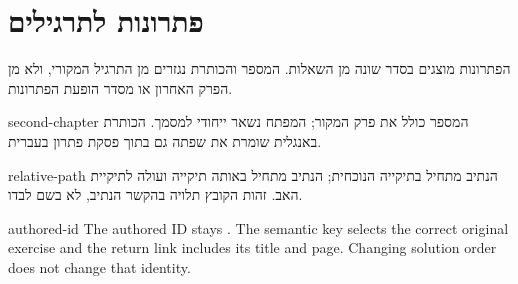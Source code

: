 \chapter*{פתרונות לתרגילים}
הפתרונות מוצגים בסדר שונה מן השאלות. המספר והכותרת נגזרים מן התרגיל
המקורי, ולא מן הפרק האחרון או מסדר הופעת הפתרונות.
\begin{studysolution}{second-chapter}
המספר כולל את פרק המקור; המפתח נשאר ייחודי למסמך. הכותרת באנגלית
שומרת את שפתה גם בתוך פסקת פתרון בעברית.
\end{studysolution}
\begin{studysolution}{relative-path}
הנתיב  מתחיל בתיקייה הנוכחית; הנתיב
 מתחיל באותה תיקייה ועולה לתיקיית האב. זהות הקובץ
תלויה בהקשר הנתיב, לא בשם לבדו.
\end{studysolution}
\begin{englishprose}
\begin{studysolution}{authored-id}
The authored ID stays . The semantic key selects the correct original
exercise and the return link includes its title and page. Changing solution
order does not change that identity.
\end{studysolution}
\end{englishprose}

